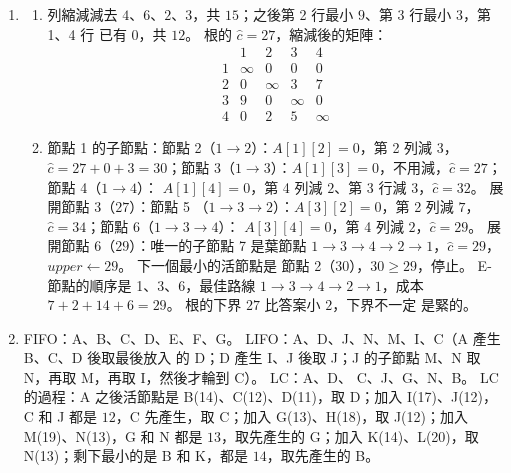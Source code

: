 \begin{enumerate}
\item
\begin{enumerate}
\item 列縮減減去 $4$、$6$、$2$、$3$，共 $15$；之後第 2 行最小 $9$、第 3 行最小 $3$，第 1、4 行
已有 $0$，共 $12$。 根的 $\hat c = 27$，縮減後的矩陣：
\[
\begin{array}{c|cccc}
 & 1 & 2 & 3 & 4 \\ \hline
1 & \infty & 0 & 0 & 0 \\
2 & 0 & \infty & 3 & 7 \\
3 & 9 & 0 & \infty & 0 \\
4 & 0 & 2 & 5 & \infty
\end{array}
\]
\item 節點 1 的子節點：節點 2（$1 \to 2$）：$A[1][2] = 0$，第 2 列減 $3$，$\hat c = 27 + 0 + 3 =
30$；節點 3（$1 \to 3$）：$A[1][3] = 0$，不用減，$\hat c = 27$；節點 4（$1 \to 4$）：
$A[1][4] = 0$，第 4 列減 $2$、第 3 行減 $3$，$\hat c = 32$。 展開節點 3（$27$）：節點 5
（$1 \to 3 \to 2$）：$A[3][2] = 0$，第 2 列減 $7$，$\hat c = 34$；節點 6（$1 \to 3 \to 4$）：
$A[3][4] = 0$，第 4 列減 $2$，$\hat c = 29$。 展開節點 6（$29$）：唯一的子節點 7 是葉節點
$1 \to 3 \to 4 \to 2 \to 1$，$\hat c = 29$，$\mathit{upper} \gets 29$。 下一個最小的活節點是
節點 2（$30$），$30 \ge 29$，停止。 E-節點的順序是 1、3、6，最佳路線
$1 \to 3 \to 4 \to 2 \to 1$，成本 $7 + 2 + 14 + 6 = 29$。 根的下界 $27$ 比答案小 $2$，下界不一定
是緊的。
\end{enumerate}

\item FIFO：A、B、C、D、E、F、G。 LIFO：A、D、J、N、M、I、C（A 產生 B、C、D 後取最後放入
的 D；D 產生 I、J 後取 J；J 的子節點 M、N 取 N，再取 M，再取 I，然後才輪到 C）。 LC：A、D、
C、J、G、N、B。 LC 的過程：A 之後活節點是 B(14)、C(12)、D(11)，取 D；加入 I(17)、J(12)，
C 和 J 都是 $12$，C 先產生，取 C；加入 G(13)、H(18)，取 J(12)；加入 M(19)、N(13)，G 和 N 都是
$13$，取先產生的 G；加入 K(14)、L(20)，取 N(13)；剩下最小的是 B 和 K，都是 $14$，取先產生的
B。


\end{enumerate}
